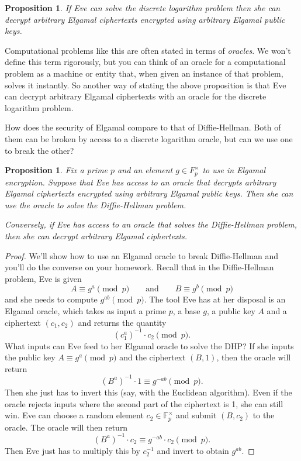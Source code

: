 \documentclass[12pt]{article}
\theoremstyle{plain}
\newtheorem{proposition}[theorem]{Proposition}
\theoremstyle{definition}
\theoremstyle{remark}
\newcommand{\F}{\mathbb{F}}
\begin{document}
\begin{proposition}
    If Eve can solve the discrete logarithm problem then she can decrypt arbitrary Elgamal ciphertexts encrypted using arbitrary Elgamal public keys.
\end{proposition}

Computational problems like this are often stated in terms of \emph{oracles}.
We won't define this term rigorously, but you can think of an oracle for a computational problem as a machine or entity that, when given an instance of that problem, solves it instantly.
So another way of stating the above proposition is that Eve can decrypt arbitrary Elgamal ciphertexts with an oracle for the discrete logarithm problem.

How does the security of Elgamal compare to that of Diffie-Hellman.
Both of them can be broken by access to a discrete logarithm oracle, but can we use one to break the other?

\begin{proposition}
    Fix a prime $p$ and an element $g\in F_p^\times$ to use in Elgamal encryption.
    Suppose that Eve has access to an oracle that decrypts arbitrary Elgamal ciphertexts encrypted using arbitrary Elgamal public keys.
    Then she can use the oracle to solve the Diffie-Hellman problem.

    Conversely, if Eve has access to an oracle that solves the Diffie-Hellman problem, then she can decrypt arbitrary Elgamal ciphertexts.
\end{proposition}

\begin{proof}
    We'll show how to use an Elgamal oracle to break Diffie-Hellman and you'll do the converse on your homework.
    Recall that in the Diffie-Hellman problem, Eve is given
    \[
        A\equiv g^{a}\pmod p\qquad\text{and}\qquad B\equiv g^b\pmod p
    \]
    and she needs to compute $g^{ab}\pmod p$.
    The tool Eve has at her disposal is an Elgamal oracle, which takes as input a prime $p$, a base $g$, a public key $A$ and a ciphertext $(c_1, c_2)$ and returns the quantity
    \[
        (c_1^a)^{-1}\cdot c_2\pmod p.
    \]
    What inputs can Eve feed to her Elgamal oracle to solve the DHP?
    If she inputs the public key $A\equiv g^a\pmod p$ and the ciphertext $(B, 1)$, then the oracle will return
    \[
        (B^a)^{-1}\cdot 1 \equiv g^{-ab}\pmod p.
    \]
    Then she just has to invert this (say, with the Euclidean algorithm).
    Even if the oracle rejects inputs where the second part of the ciphertext is 1, she can still win.
    Eve can choose a random element $c_2\in \F_p^\times$ and submit $(B, c_2)$ to the oracle.
    The oracle will then return
    \[
        (B^a)^{-1}\cdot c_2 \equiv g^{-ab}\cdot c_2\pmod p.
    \]
    Then Eve just has to multiply this by $c_2^{-1}$ and invert to obtain $g^{ab}$.
\end{proof}
\end{document}
